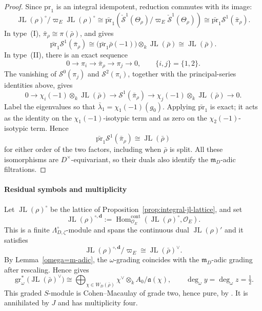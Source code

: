 \documentclass[11pt]{article}
\theoremstyle{definition}
\newcommand{\cO}{\mathcal O}
\newcommand{\mD}{\mathfrak m_D}
\newcommand{\gr}{\operatorname{gr}}
\newcommand{\Hom}{\operatorname{Hom}}
\newcommand{\JL}{\operatorname{JL}}
\begin{document}
\begin{proof}
Since $\mathrm{pr}_1$ is an integral idempotent, reduction commutes
with its image:
\[
 \JL(\rho)^\circ/\varpi_E\JL(\rho)^\circ
 \cong\bar{\mathrm{pr}}_1
       (\check{\mathcal S}^1(\Theta_\rho)/\varpi_E\check{\mathcal S}^1(\Theta_\rho))
 \cong\bar{\mathrm{pr}}_1\mathcal S^1(\bar\pi_\rho).
\]
In type~\textup{(I)}, $\bar\pi_\rho\cong\pi(\bar\rho)$, and
\cite[Theorem~4.20]{HuWangPadic} gives
\[
 \bar{\mathrm{pr}}_1\mathcal S^1(\bar\pi_\rho)
 \cong\bigl(\bar{\mathrm{pr}}_1\bar\rho(-1)\bigr)
       \otimes_k\JL(\bar\rho)
 \cong\JL(\bar\rho).
\]
In type~\textup{(II)}, there is an exact sequence
\[
 0\longrightarrow\pi_i\longrightarrow\bar\pi_\rho
 \longrightarrow\pi_j\longrightarrow0,
 \qquad\{i,j\}=\{1,2\}.
\]
The vanishing of $\mathcal S^0(\pi_j)$ and $\mathcal S^2(\pi_i)$,
together with the principal-series identities above, gives
\[
 0\longrightarrow\chi_i(-1)\otimes_k\JL(\bar\rho)
 \longrightarrow\mathcal S^1(\bar\pi_\rho)
 \longrightarrow\chi_j(-1)\otimes_k\JL(\bar\rho)
 \longrightarrow0.
\]
Label the eigenvalues so that
$\bar\lambda_1=\chi_1(-1)(g_0)$. Applying
$\bar{\mathrm{pr}}_1$ is exact; it acts as the identity on the
$\chi_1(-1)$-isotypic term and as zero on the $\chi_2(-1)$-isotypic term. Hence
\[
 \bar{\mathrm{pr}}_1\mathcal S^1(\bar\pi_\rho)
 \cong\JL(\bar\rho)
\]
for either order of the two factors, including when $\bar\rho$ is split.
All these isomorphisms are $D^\times$-equivariant, so their duals also
identify the $\mD$-adic filtrations.
\end{proof}


\paragraph{Residual symbols and multiplicity}

Let $\JL(\rho)^\circ$ be the lattice of
Proposition~\ref{prop:integral-jl-lattice}, and set
\[
 \JL(\rho)^{\circ,\mathbf d}
 :=\Hom_{\cO_E}^{\mathrm{cont}}(\JL(\rho)^\circ,\cO_E).
\]
This is a finite $\Lambda_{D,\zeta}^\circ$-module and spans the
continuous dual $\JL(\rho)'$ and it satisfies
\[
 \JL(\rho)^{\circ,\mathbf d}/\varpi_E
 \cong\JL(\bar\rho)^\vee.
\]
By Lemma~\ref{omega=m-adic}, the $\omega$-grading coincides with the
$\mD$-adic grading after rescaling. Hence
\cite[Theorem~4.19]{HuWangPadic} gives
\[
 \gr_\omega^*\bigl(\JL(\bar\rho)^\vee\bigr)
 \cong\bigoplus_{\chi\in W_D(\bar\rho)}
       \chi^\vee\otimes_k A_0/\mathfrak a(\chi),
 \qquad \deg_\omega y=\deg_\omega z=\tfrac12.
\]
This graded $S$-module is Cohen--Macaulay of grade two, hence
pure, by \cite[Theorem~4.19 and Lemma~6.2]{HuWangPadic}.
It is annihilated by $J$ and has multiplicity four.
\end{document}
